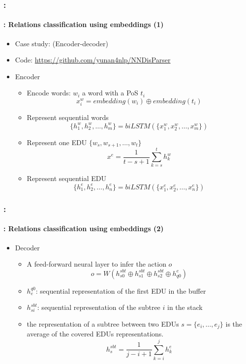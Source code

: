 \documentclass[xcolor=table]{beamer}
\begin{document}
\begin{frame}
	\frametitle{\insertshortsubtitle: \insertsection}
	\framesubtitle{\insertsubsection: Relations classification using embeddings (1)}
	
	\begin{itemize}
		\item Case study: \cite{2018-yu-al} (Encoder-decoder)
		\item Code: \url{https://github.com/yunan4nlp/NNDisParser}
		\item Encoder 
		\begin{itemize}
			\item Encode words: $ w_i $ a word with a PoS $t_i$
			\[x_i^w = embedding(w_i) \oplus embedding(t_i)\]
			\item Represent sequential words
			\[ \{h_1^w, h_2^w, \ldots, h_m^w \} = biLSTM(\{x_1^w, x_2^w, \ldots, x_m^w \})\]
			\item Represent one EDU $\{w_s, w_{s+1}, \ldots, w_t \}$
			\[ x^e = \frac{1}{t-s+1} \sum_{k=s}^{t} h_k^w\]
			\item Represent sequential EDU
			\[ \{h_1^e, h_2^e, \ldots, h_n^e \} = biLSTM(\{x_1^e, x_2^e, \ldots, x_n^e \})\]
		\end{itemize}
	\end{itemize}
	
\end{frame}

\begin{frame}
	\frametitle{\insertshortsubtitle: \insertsection}
	\framesubtitle{\insertsubsection: Relations classification using embeddings (2)}
	
	\begin{itemize}
		\item Decoder 
		\begin{itemize}
			\item A feed-forward neural layer to infer the action $o$
			\[o = W(h_{s0}^{sbt} \oplus h_{s1}^{sbt} \oplus h_{s2}^{sbt} \oplus h_{q0}^{e})\]
			\item $ h_{e}^{q0} $: sequential representation of the first EDU in the buffer
			\item $h_{si}^{sbt}$: sequential representation of the subtree $i$ in the stack
			\item the representation of a subtree between two EDUs $ s= \{e_i, \ldots, e_j\}$ is the average of the covered EDUs representations. 
			\[ h_{s}^{sbt} = \frac{1}{j-i+1} \sum_{k=i}^{j} h_k^e\]
		\end{itemize}
	\end{itemize}
	
\end{frame}
\end{document}
